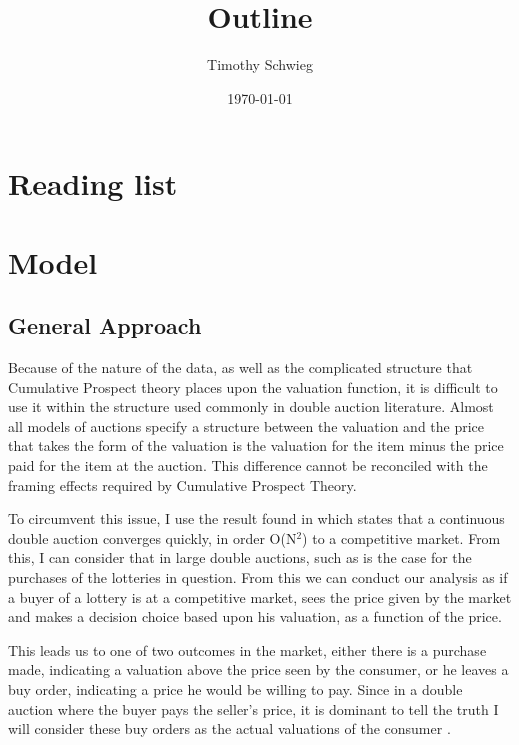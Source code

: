 \documentclass[11pt]{article}
\author{Timothy Schwieg}
\date{\today}
\title{Outline}
\begin{document}
\maketitle




\section{Reading list}
\label{sec-1}
\nocite{Efficiency}
\nocite{DoubleAuc}
\nocite{LimeBoy}
\nocite{LitReview}



\section{Model}
\label{sec-2}
\subsection{General Approach}
\label{sec-2-1}

Because of the nature of the data, as well as the complicated
structure that Cumulative Prospect theory places upon the valuation
function, it is difficult to use it within the structure used commonly
in double auction literature. Almost all models of auctions specify a
structure between the valuation and the price that takes the form of
the valuation is the valuation for the item minus the price paid for
the item at the auction. This difference cannot be reconciled with the
framing effects required by Cumulative Prospect Theory.

To circumvent this issue, I use the result found in \cite{Efficiency}
which states that a continuous double auction converges quickly, in
order O(N$^{\text{2}}$) to a competitive market. From this, I can consider that in
large double auctions, such as is the case for the purchases of the
lotteries in question. From this we can conduct our analysis as if a
buyer of a lottery is at a competitive market, sees the price given by
the market and makes a decision choice based upon his valuation, as a
function of the price. 

This leads us to one of two outcomes in the market, either there is a
purchase made, indicating a valuation above the price seen by the
consumer, or he leaves a buy order, indicating a price he would be
willing to pay. Since in a double auction where the buyer pays the
seller's price, it is dominant to tell the truth I will consider these
buy orders as the actual valuations of the consumer \cite{PriceDataOnly}. 
\end{document}
